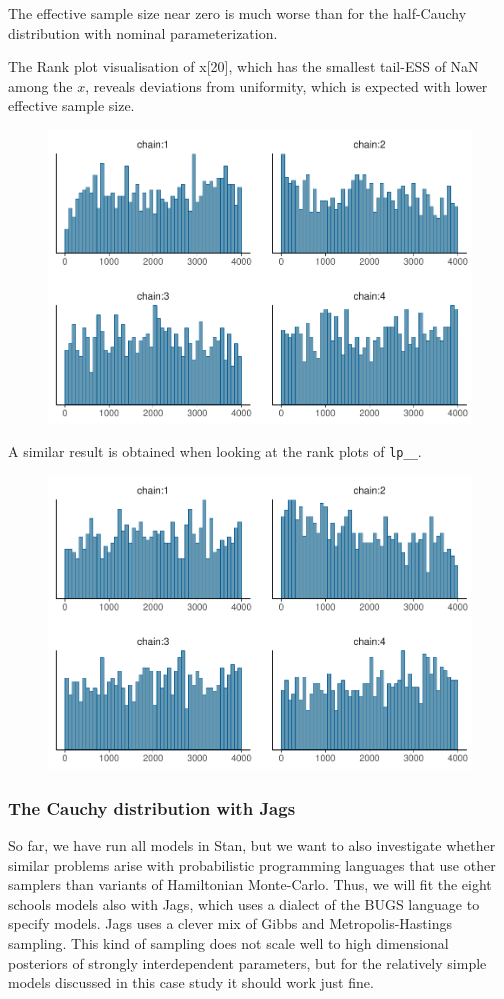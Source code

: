 \documentclass[american,]{article}
\begin{document}
The effective sample size near zero is much worse than for the
half-Cauchy distribution with nominal parameterization.

The Rank plot visualisation of x{[}20{]}, which has the smallest
tail-ESS of NaN among the \(x\), reveals deviations from uniformity,
which is expected with lower effective sample size.

\begin{figure}[t]
  \centering
  \includegraphics[width=0.6\linewidth]{graphics/hist-fit-half-reparam-1.pdf}
\end{figure}

A similar result is obtained when looking at the rank plots of
\texttt{lp\_\_}.

\begin{figure}[t]
  \centering
  \includegraphics[width=0.6\linewidth]{graphics/hist-fit-half-reparam-lp-1.pdf}
\end{figure}

\hypertarget{the-cauchy-distribution-with-jags}{%
\subsubsection*{The Cauchy distribution with
Jags}\label{the-cauchy-distribution-with-jags}}

So far, we have run all models in Stan, but we want to also investigate
whether similar problems arise with probabilistic programming languages
that use other samplers than variants of Hamiltonian Monte-Carlo. Thus,
we will fit the eight schools models also with Jags, which uses a
dialect of the BUGS language to specify models. Jags uses a clever mix
of Gibbs and Metropolis-Hastings sampling. This kind of sampling does
not scale well to high dimensional posteriors of strongly interdependent
parameters, but for the relatively simple models discussed in this case
study it should work just fine.
\end{document}
